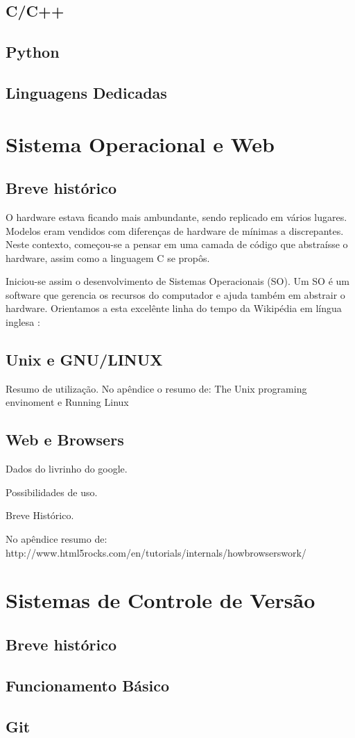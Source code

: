 \subsection{C/C++}

\subsection{Python}

\subsection{Linguagens Dedicadas}

\section{Sistema Operacional e Web}

\subsection{Breve histórico}

O hardware estava ficando mais ambundante, sendo replicado em 
vários lugares. Modelos eram vendidos com diferenças de hardware 
de mínimas a discrepantes. Neste contexto, começou-se a
pensar em uma camada de código que abstraísse o hardware, assim
como a linguagem C se propôs.

Iniciou-se assim o desenvolvimento de Sistemas Operacionais (SO).
Um SO é um software que gerencia os recursos do computador e ajuda
também em abstrair o hardware. Orientamos a esta excelênte linha do
tempo da Wikipédia em língua inglesa \cite{solinhadotempo}:



\subsection{Unix e GNU/LINUX}

Resumo de utilização. No apêndice o resumo de:
The Unix programing envinoment
e
Running Linux

\subsection{Web e Browsers}

Dados do livrinho do google.

Possibilidades de uso.

Breve Histórico.

No apêndice resumo de:
http://www.html5rocks.com/en/tutorials/internals/howbrowserswork/


\section{Sistemas de Controle de Versão}

\subsection{Breve histórico}

\subsection{Funcionamento Básico}

\subsection{Git}

